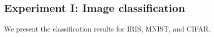 %

\subsection{Experiment I: Image classification}
We present the classification results for IRIS, MNIST,  and CIFAR. %

  


